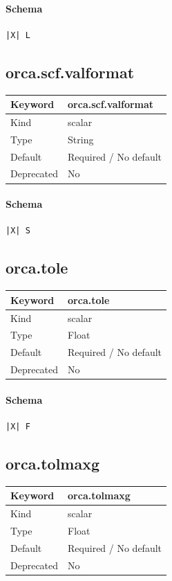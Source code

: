 \documentclass[11pt]{article}
\begin{document}
{{{{{\paragraph{Schema}
\begin{Verbatim}
|X| L
\end{Verbatim}

\subsection{orca.scf.valformat}
\label{kw:orca-scf-valformat}
\begin{longtable}{|p{1.5in}|p{4.5in}|}
\hline
Keyword & orca.scf.valformat \\
\hline
Kind & scalar \\
\hline
Type & String \\
\hline
Default & Required / No default \\
\hline
Deprecated & No \\
\hline
\end{longtable}
\paragraph{Schema}
\begin{Verbatim}
|X| S
\end{Verbatim}

\subsection{orca.tole}
\label{kw:orca-tole}
\begin{longtable}{|p{1.5in}|p{4.5in}|}
\hline
Keyword & orca.tole \\
\hline
Kind & scalar \\
\hline
Type & Float \\
\hline
Default & Required / No default \\
\hline
Deprecated & No \\
\hline
\end{longtable}
\paragraph{Schema}
\begin{Verbatim}
|X| F
\end{Verbatim}

\subsection{orca.tolmaxg}
\label{kw:orca-tolmaxg}
\begin{longtable}{|p{1.5in}|p{4.5in}|}
\hline
Keyword & orca.tolmaxg \\
\hline
Kind & scalar \\
\hline
Type & Float \\
\hline
Default & Required / No default \\
\hline
Deprecated & No \\
\hline
\end{longtable}
}}}}}
\end{document}
